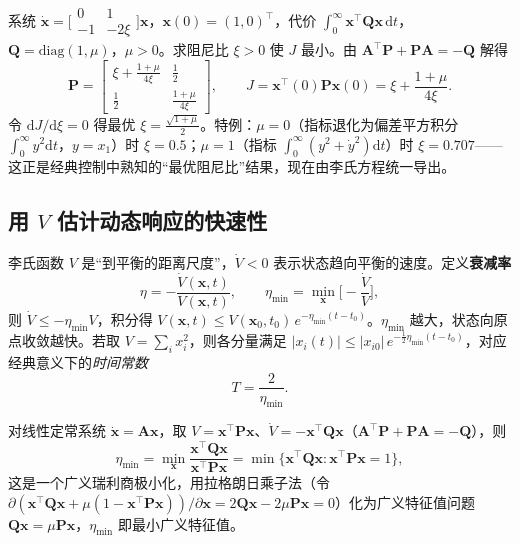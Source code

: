 \begin{example}[阻尼比最优化]\label{ex:paramopt}
系统 $\dot{\mathbf{x}}=\big[\begin{smallmatrix}0&1\\-1&-2\xi\end{smallmatrix}\big]\mathbf{x}$，$\mathbf{x}(0)=(1,0)^\top$，代价 $\int_0^\infty\mathbf{x}^\top\mathbf{Q}\mathbf{x}\,\mathrm dt$，$\mathbf{Q}=\mathrm{diag}(1,\mu)$，$\mu>0$。求阻尼比 $\xi>0$ 使 $J$ 最小。由 $\mathbf{A}^\top\mathbf{P}+\mathbf{P}\mathbf{A}=-\mathbf{Q}$ 解得
\[
  \mathbf{P}=\begin{bmatrix}\xi+\frac{1+\mu}{4\xi}&\tfrac12\\[2pt]\tfrac12&\frac{1+\mu}{4\xi}\end{bmatrix},
  \qquad J=\mathbf{x}^\top(0)\mathbf{P}\mathbf{x}(0)=\xi+\frac{1+\mu}{4\xi}.
\]
令 $\mathrm dJ/\mathrm d\xi=0$ 得最优 $\xi=\tfrac{\sqrt{1+\mu}}{2}$。特例：$\mu=0$（指标退化为偏差平方积分 $\int_0^\infty y^2\mathrm dt$，$y=x_1$）时 $\xi=0.5$；$\mu=1$（指标 $\int_0^\infty(y^2+\dot y^2)\mathrm dt$）时 $\xi=0.707$——这正是经典控制中熟知的“最优阻尼比”结果，现在由李氏方程统一导出。
\end{example}

\subsection{用 \texorpdfstring{$V$}{V} 估计动态响应的快速性}
\label{sec:lyap-speed}

李氏函数 $V$ 是“到平衡的距离尺度”，$\dot V<0$ 表示状态趋向平衡的速度。定义\textbf{衰减率}
\begin{equation}
  \eta=-\frac{\dot V(\mathbf{x},t)}{V(\mathbf{x},t)},\qquad
  \eta_{\min}=\min_{\mathbf{x}}\Big[-\frac{\dot V}{V}\Big],
  \label{eq:eta-def}
\end{equation}
则 $\dot V\le-\eta_{\min}V$，积分得 $V(\mathbf{x},t)\le V(\mathbf{x}_0,t_0)\,e^{-\eta_{\min}(t-t_0)}$。$\eta_{\min}$ 越大，状态向原点收敛越快。若取 $V=\sum_i x_i^2$，则各分量满足 $|x_i(t)|\le|x_{i0}|\,e^{-\frac12\eta_{\min}(t-t_0)}$，对应经典意义下的\emph{时间常数}
\begin{equation}
  T=\frac{2}{\eta_{\min}}.
  \label{eq:time-const}
\end{equation}

对线性定常系统 $\dot{\mathbf{x}}=\mathbf{A}\mathbf{x}$，取 $V=\mathbf{x}^\top\mathbf{P}\mathbf{x}$、$\dot V=-\mathbf{x}^\top\mathbf{Q}\mathbf{x}$（$\mathbf{A}^\top\mathbf{P}+\mathbf{P}\mathbf{A}=-\mathbf{Q}$），则
\begin{equation}
  \eta_{\min}=\min_{\mathbf{x}}\frac{\mathbf{x}^\top\mathbf{Q}\mathbf{x}}{\mathbf{x}^\top\mathbf{P}\mathbf{x}}
  =\min\{\mathbf{x}^\top\mathbf{Q}\mathbf{x}:\mathbf{x}^\top\mathbf{P}\mathbf{x}=1\},
  \label{eq:eta-min-linear}
\end{equation}
这是一个广义瑞利商极小化，用拉格朗日乘子法（令 $\partial(\mathbf{x}^\top\mathbf{Q}\mathbf{x}+\mu(1-\mathbf{x}^\top\mathbf{P}\mathbf{x}))/\partial\mathbf{x}=2\mathbf{Q}\mathbf{x}-2\mu\mathbf{P}\mathbf{x}=0$）化为广义特征值问题 $\mathbf{Q}\mathbf{x}=\mu\mathbf{P}\mathbf{x}$，$\eta_{\min}$ 即最小广义特征值。

